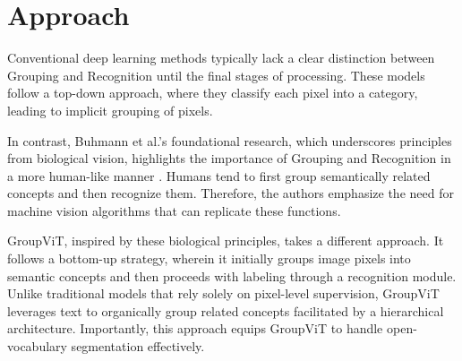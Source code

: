 \chapter{Approach}\label{chap:approach}


Conventional deep learning methods typically lack a clear distinction between Grouping and Recognition until the final stages of processing. These models follow a top-down approach, where they classify each pixel into a category, leading to implicit grouping of pixels.

In contrast, Buhmann et al.'s foundational research, which underscores principles from biological vision, highlights the importance of Grouping and Recognition in a more human-like manner \cite{buhmann1999image}\cite{zhu1997prior}. Humans tend to first group semantically related concepts and then recognize them. Therefore, the authors emphasize the need for machine vision algorithms that can replicate these functions.

GroupViT, inspired by these biological principles, takes a different approach. It follows a bottom-up strategy, wherein it initially groups image pixels into semantic concepts and then proceeds with labeling through a recognition module. Unlike traditional models that rely solely on pixel-level supervision, GroupViT leverages text to organically group related concepts facilitated by a hierarchical architecture. Importantly, this approach equips GroupViT to handle open-vocabulary segmentation effectively.


